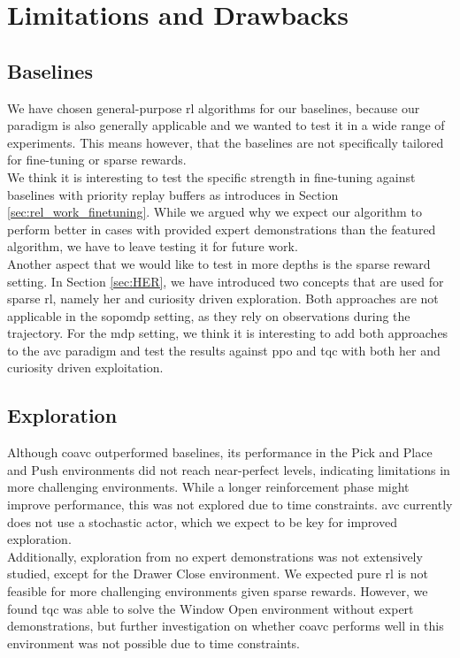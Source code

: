 \section{Limitations and Drawbacks}
\subsection{Baselines}
We have chosen general-purpose \ac{rl} algorithms for our baselines, because our paradigm is also generally applicable 
and we wanted to test it in a wide range of experiments. This means however, that the baselines are not specifically tailored for fine-tuning or sparse rewards.\\ 

We think it is interesting to test the specific strength in fine-tuning against baselines with priority replay buffers as introduces in Section \ref{sec:rel_work_finetuning}. 
While we argued why we expect our algorithm to perform better in cases with provided expert demonstrations than the featured algorithm, we have to 
leave testing it for future work.\\

Another aspect that we would like to test in more depths is the sparse reward setting. In Section \ref{sec:HER}, we have introduced two concepts that are used for sparse \ac{rl}, namely 
\ac{her} and curiosity driven exploration. Both approaches are not applicable in the \ac{sopomdp} setting, as they rely on observations during the trajectory. 
For the \ac{mdp} setting, we think it is interesting to add both approaches to the \ac{avc} paradigm and test the results against \ac{ppo} and \ac{tqc} with both \ac{her} and curiosity driven exploitation. 

\subsection{Exploration}
Although \ac{coavc} outperformed baselines, its performance in the Pick and Place and Push environments did not reach near-perfect levels, 
indicating limitations in more challenging environments. While a longer reinforcement phase might improve performance, this was not explored 
due to time constraints. \ac{avc} currently does not use a stochastic actor, which we expect to be key for improved exploration.\\ 

Additionally, exploration from no expert demonstrations was not extensively studied, except for the Drawer Close 
environment. We expected pure \ac{rl} is not feasible for more challenging environments given sparse rewards. 
However, we found \ac{tqc} was able to solve the Window Open environment without expert demonstrations, but further investigation on whether 
\ac{coavc} performs well in this environment was not possible due to time constraints.\\ 

